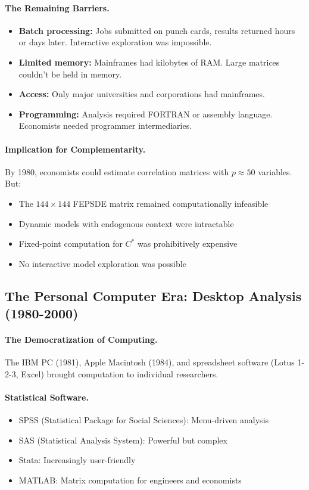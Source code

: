 \paragraph{The Remaining Barriers.}
\begin{itemize}
  \item \textbf{Batch processing:} Jobs submitted on punch cards, results returned hours or days later.
        Interactive exploration was impossible.
  \item \textbf{Limited memory:} Mainframes had kilobytes of RAM.
        Large matrices couldn't be held in memory.
  \item \textbf{Access:} Only major universities and corporations had mainframes.
  \item \textbf{Programming:} Analysis required FORTRAN or assembly language.
        Economists needed programmer intermediaries.
\end{itemize}

\paragraph{Implication for Complementarity.}
By 1980, economists could estimate correlation matrices with $p \approx 50$ variables.
But:
\begin{itemize}
  \item The $144 \times 144$ FEPSDE matrix remained computationally infeasible
  \item Dynamic models with endogenous context were intractable
  \item Fixed-point computation for $C^*$ was prohibitively expensive
  \item No interactive model exploration was possible
\end{itemize}

\subsection{The Personal Computer Era: Desktop Analysis (1980-2000)}

\paragraph{The Democratization of Computing.}
The IBM PC (1981), Apple Macintosh (1984), and spreadsheet software (Lotus 1-2-3, Excel)
brought computation to individual researchers.

\paragraph{Statistical Software.}
\begin{itemize}
  \item SPSS (Statistical Package for Social Sciences): Menu-driven analysis
  \item SAS (Statistical Analysis System): Powerful but complex
  \item Stata: Increasingly user-friendly
  \item MATLAB: Matrix computation for engineers and economists
\end{itemize}

